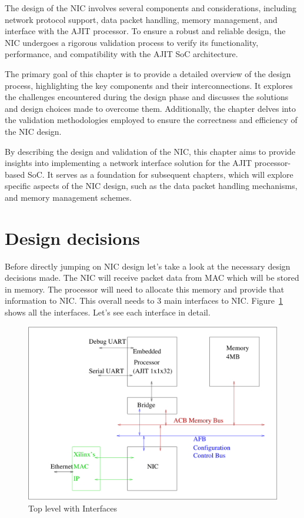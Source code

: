 \documentclass[12pt]{report}
\begin{document}
The design of the NIC involves several components and considerations, including network protocol support, data packet handling, memory management, and interface with the AJIT processor. To ensure a robust and reliable design, the NIC undergoes a rigorous validation process to verify its functionality, performance, and compatibility with the AJIT SoC architecture.

The primary goal of this chapter is to provide a detailed overview of the design process, highlighting the key components and their interconnections. It explores the challenges encountered during the design phase and discusses the solutions and design choices made to overcome them. Additionally, the chapter delves into the validation methodologies employed to ensure the correctness and efficiency of the NIC design.

By describing the design and validation of the NIC, this chapter aims to provide insights into implementing a network interface solution for the AJIT processor-based SoC. It serves as a foundation for subsequent chapters, which will explore specific aspects of the NIC design, such as the data packet handling mechanisms, and memory management schemes.

	
	\section{Design decisions}
		Before directly jumping on NIC design let's take a look at the necessary design decisions made. The NIC will receive packet data from MAC
		which will be stored in memory. The processor will need to allocate this memory and provide that information to NIC. This overall needs to
		3 main interfaces to NIC. Figure~\ref{fig:NIC-Proc-top-level} shows all the interfaces. Let's see each interface in detail.	

		\begin{figure}[h]
			\centering
			\includegraphics[width=12cm]{./figures/top_level_for_interfaces.pdf}
			\caption{Top level with Interfaces}
			\label{fig:NIC-Proc-top-level}
		\end{figure}
\end{document}
